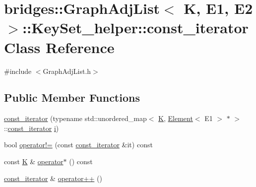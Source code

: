 \hypertarget{classbridges_1_1_graph_adj_list_1_1_key_set__helper_1_1const__iterator}{}\section{bridges\+:\+:Graph\+Adj\+List$<$ K, E1, E2 $>$\+:\+:Key\+Set\+\_\+helper\+:\+:const\+\_\+iterator Class Reference}
\label{classbridges_1_1_graph_adj_list_1_1_key_set__helper_1_1const__iterator}


{\ttfamily \#include $<$Graph\+Adj\+List.\+h$>$}

\subsection*{Public Member Functions}
\begin{DoxyCompactItemize}
\item 
\hyperlink{classbridges_1_1_graph_adj_list_1_1_key_set__helper_1_1const__iterator_abb8d984914cd0d4cdd75d1776adade9a}{const\+\_\+iterator} (typename std\+::unordered\+\_\+map$<$ \hyperlink{namespacebridges_acfb0a4f7877d8f63de3e6862004c50edaa5f3c6a11b03839d46af9fb43c97c188}{K}, \hyperlink{classbridges_1_1_element}{Element}$<$ E1 $>$ $\ast$ $>$\+::\hyperlink{classbridges_1_1_graph_adj_list_1_1_key_set__helper_1_1const__iterator}{const\+\_\+iterator} \hyperlink{namespacebridges_acfb0a4f7877d8f63de3e6862004c50eda865c0c0b4ab0e063e5caa3387c1a8741}{i})
\item 
bool \hyperlink{classbridges_1_1_graph_adj_list_1_1_key_set__helper_1_1const__iterator_a519b936d0ce2ff34c587a43b1a3e7a62}{operator!=} (const \hyperlink{classbridges_1_1_graph_adj_list_1_1_key_set__helper_1_1const__iterator}{const\+\_\+iterator} \&it) const
\item 
const \hyperlink{namespacebridges_acfb0a4f7877d8f63de3e6862004c50edaa5f3c6a11b03839d46af9fb43c97c188}{K} \& \hyperlink{classbridges_1_1_graph_adj_list_1_1_key_set__helper_1_1const__iterator_a0dba71147b10315e669ed929de0be62d}{operator$\ast$} () const
\item 
\hyperlink{classbridges_1_1_graph_adj_list_1_1_key_set__helper_1_1const__iterator}{const\+\_\+iterator} \& \hyperlink{classbridges_1_1_graph_adj_list_1_1_key_set__helper_1_1const__iterator_a9fa08ff89640b3347c15a3858664cfdc}{operator++} ()
\end{DoxyCompactItemize}


